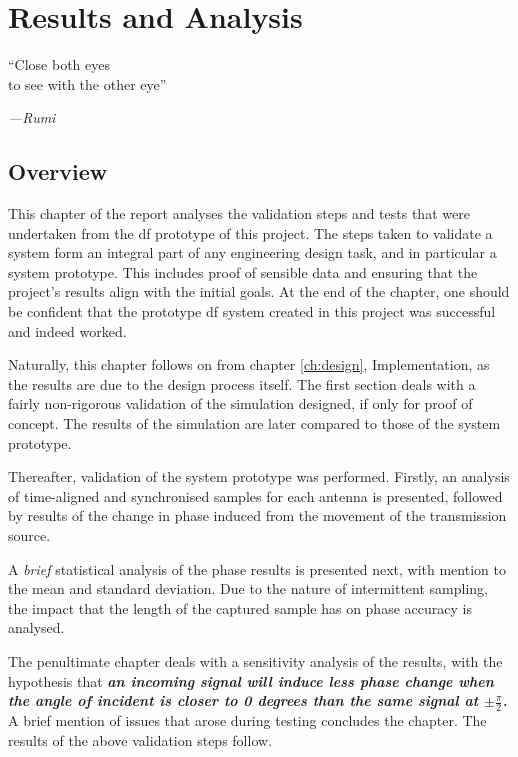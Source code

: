 \documentclass[class=report,11pt,crop=false]{standalone}
\begin{document}
\ifstandalone
\tableofcontents
\fi
\chapter{Results and Analysis \label{ch:results}}
\epigraph{``Close both eyes \\ to see with the other eye''}%
  {\emph{---{Rumi}}}


\vspace{0.5cm}

\section{Overview}
This chapter of the report analyses the validation steps and tests that were undertaken from the \gls{df} prototype of this project. The steps taken to validate a system form an integral part of any engineering design task, and in particular a system prototype. This includes proof of sensible data and ensuring that the project's results align with the initial goals. 
At the end of the chapter, one should be confident that the prototype \gls{df} system created in this project was successful and indeed worked. 

Naturally, this chapter follows on from chapter \ref{ch:design}, Implementation, as the results are due to the design process itself. The first section deals with a fairly non-rigorous validation of the simulation designed, if only for proof of concept. The results of the simulation are later compared to those of the system prototype. 

Thereafter, validation of the system prototype was performed. Firstly, an analysis of time-aligned and synchronised samples for each antenna is presented, followed by results of the change in phase induced from the movement of the transmission source. 

A \emph{brief} statistical analysis of the phase results is presented next, with mention to the mean and standard deviation. %
Due to the nature of intermittent sampling, the impact that the length of the captured sample has on phase accuracy is analysed. 

The penultimate chapter deals with a sensitivity analysis of the results, with the hypothesis that \textbf{\emph{an incoming signal will induce less phase change when the angle of incident is closer to 0 degrees than the same signal at $\pm \frac{\pi}{2}$.}}
A brief mention of issues that arose during testing concludes the chapter. The results of the above validation steps follow.
\end{document}
